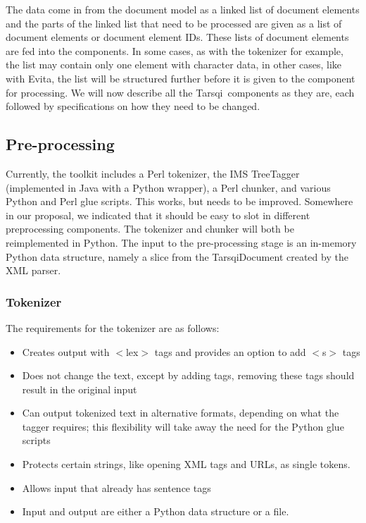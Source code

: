 \documentclass[11pt]{article}
\newcommand{\tarsqi}{T{\sc arsqi}}
\begin{document}
The data come in from the document model as a linked list of document elements and the parts of the linked list that need to be processed are given as a list of document elements or document element IDs. These lists of document elements are fed into the components. In some cases, as with the tokenizer for example, the list may contain only one element with character data, in other cases, like with Evita, the list will be structured further before it is given to the component for processing. We will now describe all the \tarsqi\ components as they are, each followed by specifications on how they need to be changed. 

\subsection{Pre-processing}

Currently, the toolkit includes a Perl tokenizer, the IMS TreeTagger (implemented in Java with a Python wrapper), a Perl chunker, and various Python and Perl glue scripts. This works, but needs to be improved. Somewhere in our proposal, we indicated that it should be easy to slot in different preprocessing components. The tokenizer and chunker will both be reimplemented in Python. The input to the pre-processing stage is an in-memory Python data structure, namely a slice from the TarsqiDocument created by the XML parser.

\subsubsection{Tokenizer}

The requirements for the tokenizer are as follows:

\begin{itemize}

\item Creates output with $<$lex$>$ tags and provides an option to add $<$s$>$ tags

\item Does not change the text, except by adding tags, removing these tags should result in the original input

\item Can output tokenized text in alternative formats, depending on what the tagger requires; this flexibility will take away the need for the Python glue scripts

\item Protects certain strings, like opening XML tags and URLs, as single tokens.

\item Allows input that already has sentence tags

\item Input and output are either a Python data structure or a file.

\end{itemize}
\end{document}
